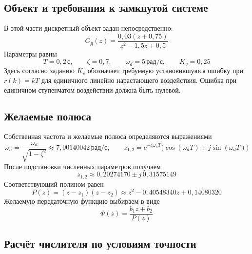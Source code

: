 \subsection{Объект и требования к замкнутой системе}

В этой части дискретный объект задан непосредственно:
\begin{equation}
  G_{\text{д}}(z)=\frac{0{,}03(z+0{,}75)}{z^2-1{,}5z+0{,}5}
  \label{eq:pole-placement-plant}
\end{equation}
Параметры равны
\begin{equation}
  T=0{,}2\,\text{с},\qquad \zeta=0{,}7,
  \qquad \omega_d=5\,\text{рад/с},\qquad K_v=0{,}25
  \label{eq:pole-placement-data}
\end{equation}
Здесь согласно заданию $K_v$ обозначает требуемую установившуюся
ошибку при $r(k)=kT$ для единичного линейно нарастающего воздействия.
Ошибка при единичном ступенчатом воздействии должна быть нулевой.

\subsection{Желаемые полюса}

Собственная частота и желаемые полюса определяются выражениями
\begin{equation}
  \omega_n=\frac{\omega_d}{\sqrt{1-\zeta^2}}
       \approx7{,}00140042\,\text{рад/с},
  \qquad
  z_{1,2}=e^{-\zeta\omega_nT}
        \bigl(\cos(\omega_dT)\pm j\sin(\omega_dT)\bigr)
  \label{eq:desired-poles}
\end{equation}
После подстановки численных параметров получаем
\begin{equation}
  z_{1,2}\approx0{,}20274170\pm j\,0{,}31575149
  \label{eq:desired-poles-numeric}
\end{equation}
Соответствующий полином равен
\begin{equation}
  P(z)=(z-z_1)(z-z_2)
       \approx z^2-0{,}40548340z+0{,}14080320
  \label{eq:desired-polynomial}
\end{equation}
Желаемую передаточную функцию выбираем в виде
\begin{equation}
  \Phi(z)=\frac{b_1z+b_2}{P(z)}
  \label{eq:pole-placement-reference}
\end{equation}

\subsection{Расчёт числителя по условиям точности}

